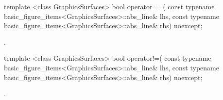 %
\begin{itemdecl}
template <class GraphicsSurfaces>
bool operator==(
  const typename basic_figure_items<GraphicsSurfaces>::abs_line& lhs,
  const typename basic_figure_items<GraphicsSurfaces>::abs_line& rhs)
  noexcept;
\end{itemdecl}
\begin{itemdescr}
\pnum
\returns
{}.
\end{itemdescr}

%
\begin{itemdecl}
template <class GraphicsSurfaces>
bool operator!=(
  const typename basic_figure_items<GraphicsSurfaces>::abs_line& lhs,
  const typename basic_figure_items<GraphicsSurfaces>::abs_line& rhs)
  noexcept;
\end{itemdecl}
\begin{itemdescr}
\pnum
\returns {}.
\end{itemdescr}
